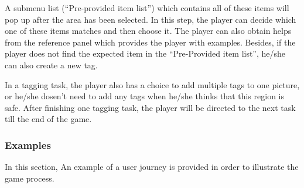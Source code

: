 A submenu list (``Pre-provided item list'') which contains all of these items will pop up after the area has been selected.
In this step,
the player can decide which one of these items matches and then choose it.
The player can also obtain helps from the reference panel which provides the player with examples.
Besides, 
if the player does not find the expected item in the ``Pre-Provided item list'',
he/she can also create a new tag.

In a tagging task,
the player also has a choice to add multiple tags to one picture,
or he/she dosen't need to add any tags when he/she thinks that this region is safe.
After finishing one tagging task, 
the player will be directed to the next task till the end of the game.

\subsubsection{Examples}
In this section,
An example of a user journey is provided in order to illustrate the game process.

